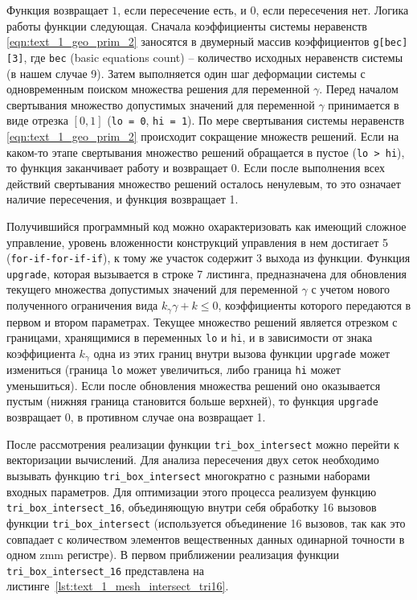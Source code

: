 Функция возвращает $1$, если пересечение есть, и $0$, если пересечения нет.
Логика работы функции следующая.
Сначала коэффициенты системы неравенств \eqref{eqn:text_1_geo_prim_2} заносятся в двумерный массив коэффициентов \texttt{g[bec][3]}, где \texttt{bec} (basic equations count) -- количество исходных неравенств системы (в нашем случае 9).
Затем выполняется один шаг деформации системы\label{term:deform_sys_lin_neravenstv2} с одновременным поиском множества решения для переменной $\gamma$.
Перед началом свертывания множество допустимых значений для переменной $\gamma$ принимается в виде отрезка $[0, 1]$ (\texttt{lo = 0}, \texttt{hi = 1}).
По мере свертывания системы неравенств \eqref{eqn:text_1_geo_prim_2} происходит сокращение множеств решений.
Если на каком-то этапе свертывания множество решений обращается в пустое (\texttt{lo > hi}), то функция заканчивает работу и возвращает 0.
Если после выполнения всех действий свертывания множество решений осталось ненулевым, то это означает наличие пересечения, и функция возвращает 1.

Получившийся программный код можно охарактеризовать как имеющий сложное управление, уровень вложенности конструкций управления в нем достигает 5 (\texttt{for-if-for-if-if}), к тому же участок содержит 3 выхода из функции.
Функция \texttt{upgrade}, которая вызывается в строке 7 листинга, предназначена для обновления текущего множества допустимых значений для переменной $\gamma$ с учетом нового полученного ограничения вида $k_{\gamma} \gamma + k \le 0$, коэффициенты которого передаются в первом и втором параметрах.
Текущее множество решений является отрезком с границами, хранящимися в переменных \texttt{lo} и \texttt{hi}, и в зависимости от знака коэффициента $k_{\gamma}$ одна из этих границ внутри вызова функции \texttt{upgrade} может измениться (граница \texttt{lo} может увеличиться, либо граница \texttt{hi} может уменьшиться).
Если после обновления множества решений оно оказывается пустым (нижняя граница становится больше верхней), то функция \texttt{upgrade} возвращает 0, в противном случае она возвращает 1.

После рассмотрения реализации функции \texttt{tri\_box\_intersect} можно перейти к векторизации вычислений\label{term:vectorization3}.
Для анализа пересечения двух сеток необходимо вызывать функцию \texttt{tri\_box\_intersect} многократно с разными наборами входных параметров.
Для оптимизации этого процесса реализуем функцию \texttt{tri\_box\_intersect\_16}, объединяющую внутри себя обработку 16 вызовов функции \texttt{tri\_box\_intersect} (используется объединение 16 вызовов, так как это совпадает с количеством элементов вещественных данных одинарной точности в одном zmm регистре).
В первом приближении реализация функции \texttt{tri\_box\_intersect\_16} представлена на листинге~\ref{lst:text_1_mesh_intersect_tri16}.

